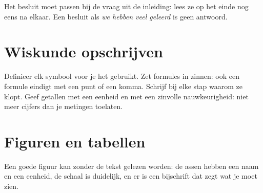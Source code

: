 Het besluit moet passen bij de vraag uit de inleiding: lees ze op het einde nog eens na elkaar. Een besluit als \textit{we hebben veel geleerd} is geen antwoord.

\begin{oefeningen}
\end{oefeningen}

\section{Wiskunde opschrijven}

\begin{werkwijze}
Definieer elk symbool voor je het gebruikt. Zet formules in zinnen: ook een formule eindigt met een punt of een komma. Schrijf bij elke stap waarom ze klopt. Geef getallen met een eenheid en met een zinvolle nauwkeurigheid: niet meer cijfers dan je metingen toelaten.
\end{werkwijze}


\begin{oefeningen}

\end{oefeningen}

\section{Figuren en tabellen}

Een goede figuur kan zonder de tekst gelezen worden: de assen hebben een naam en een eenheid, de schaal is duidelijk, en er is een bijschrift dat zegt wat je moet zien.

